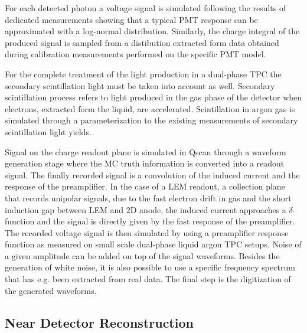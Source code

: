 For each detected photon a voltage signal is simulated following the results of dedicated 
measurements showing that a typical PMT response can be approximated with a log-normal distribution.
Similarly, the charge integral of the produced signal is sampled from a distibution extracted form data obtained during calibration measurements
performed on the specific PMT model.

For the complete treatment of the light production in a dual-phase TPC
the secondary scintillation light must be taken into account as well.
Secondary scintillation process refers to light produced in the gas phase of the detector when electrons, extracted form the liquid, are accelerated.
Scintillation in argon gas is simulated through a parameterization to the existing measurements of secondary scintillation light yields.

Signal on the charge readout plane is simulated in Qscan through a waveform generation stage where the MC truth information
is converted into a readout signal. 
The finally recorded signal  is a convolution of the induced current and the response of the preamplifier.
In the case of a LEM readout, 
a collection plane that records unipolar signals,  due to the fast electron drift in gas and the short induction gap between LEM and 2D anode, 
the induced current approaches a $\delta$-function and the signal is directly given by the fast response of the preamplifier.
The recorded voltage signal is then simulated by using a preamplifier response function
as measured on small scale dual-phase liquid argon TPC setups. 
Noise of a given amplitude can be added on top of the signal waveforms.
Besides the generation of white noise, it is also possible to use a specific frequency spectrum that has e.g. been extracted from real data. 
The final step is the digitization of the generated waveforms.



\subsection{Near Detector Reconstruction}
\label{sec:detectors-sc-physics-software-reconstruction-nd}

